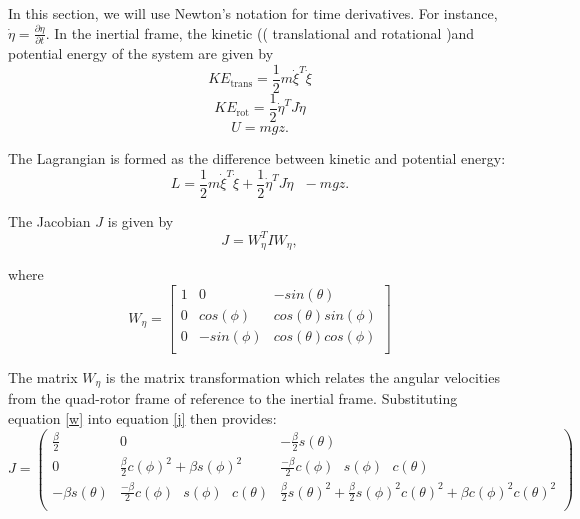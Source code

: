 In this section, we will use Newton's notation for time derivatives. For instance, $\dot \eta = \frac{\partial \eta}{\partial t} $.  In the inertial frame, the kinetic (( translational and rotational )and potential energy of the system are given by
\begin{equation}
    KE_{\text{trans}}=\frac{1}{2}m\dot{\xi }^T\dot{\xi }
\end{equation}
\begin{equation}
    KE_{\text{rot}}= \frac{1}{2}\dot{\eta }^T J \dot{\eta }
\end{equation}
\begin{equation}
    U = m g z.
\end{equation}

The Lagrangian is formed as the difference between kinetic and potential energy:
\begin{equation}
    L = \frac{1}{2}m\dot{\xi }^T\dot{\xi }+\frac{1}{2}\dot{\eta }^T   J   \dot{\eta }\text{  }- m g z .
\end{equation}

The Jacobian $J$ is given by
\begin{equation}
  \label{j}
    J = W_{\eta}^T I W_{\eta} ,
\end{equation}

where
\begin{equation}
\label{w}
 W_{\eta} = \left[ \begin{array}{ccc}
1 & 0 & -sin(\theta)\\ 0 & cos(\phi) & cos(\theta) sin(\phi)\\ 0 & -sin(\phi) & cos(\theta) cos(\phi)\\
\end{array} \right]
\end{equation}



\noindent The matrix $ W_{\eta}$ is the matrix transformation which relates the angular velocities from the quad-rotor frame of reference to the inertial frame. Substituting equation \ref{w} into equation \ref{j} then provides:
\begin{equation}
\label{J}
J= \left(
\begin{array}{ccc}
 \frac{\beta }{2}    & 0                                                                    & -\frac{\beta }{2}s(\theta) \\
 0                   & \frac{\beta}{2} c(\phi)^2 + \beta s(\phi)^2                       & \frac{- \beta}{2} c(\phi) \text{ } s(\phi) \text{ } c(\theta)  \\
 -\beta s(\theta)   & \frac{- \beta}{2} c(\phi) \text{ } s(\phi) \text{ } c(\theta)    & \frac{\beta }{2}s(\theta)^2 + \frac{\beta }{2} s(\phi)^2  c(\theta)^2 + \beta  c(\phi)^2  c(\theta)^2  \\
\end{array}
\right)
\end{equation}




